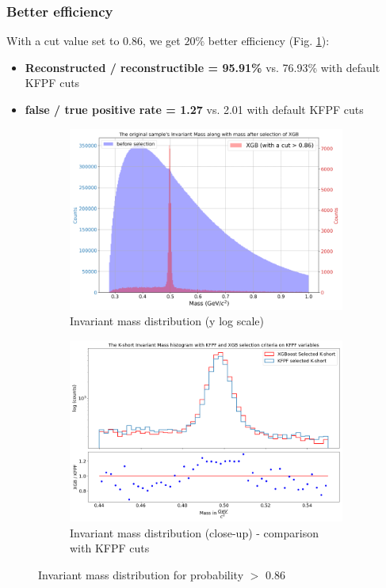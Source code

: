 \documentclass[12pt,a4paper]{report}
\begin{document}
\subsubsection{Better efficiency}
With a cut value set to 0.86, we get $20\%$ better efficiency (Fig. \ref{effic}):
\begin{itemize}
    \item \textbf{Reconstructed \PKshort / reconstructible \PKshort = 95.91\%}  vs. 76.93\% with default KFPF cuts
    \item \textbf{false / true positive rate = 1.27} vs. 2.01 with default KFPF cuts
\end{itemize}
\begin{figure}
 \centering
    \begin{subfigure}[b]{0.99\linewidth} 
        \centering
        \includegraphics[width=\textwidth]{images/better_efficiency1.png} 
        \caption{Invariant mass distribution (y log scale)} 
        \vspace{0.3cm}
    \end{subfigure}
     \hfill
       \begin{subfigure}[b]{0.99\linewidth}
        \centering
        \includegraphics[width=\textwidth]{images/better_efficiency2.png} 
        \caption{Invariant mass distribution (close-up) - comparison with KFPF cuts}
        \vspace{0.3cm}
    \end{subfigure}
    \caption{Invariant mass distribution for probability $>$ 0.86}\label{effic}
\end{figure}
\end{document}
